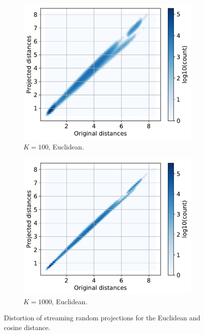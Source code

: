 \documentclass[11pt,onecolumn]{article}
\begin{document}
\begin{figure}[h!]
\begin{subfigure}[t]{0.29\textwidth}
				\includegraphics[width=\linewidth]{fig/streamhash_projection_euclidean_k100.pdf}
				\caption{$K=100$, Euclidean.}
		\end{subfigure}
		\hfill
		\begin{subfigure}[t]{0.29\textwidth}
				\centering
				\includegraphics[width=\linewidth]{fig/streamhash_projection_euclidean_k1000.pdf}
				\caption{$K=1000$, Euclidean.}
		\end{subfigure}
    \caption{Distortion of streaming random projections for the Euclidean and cosine distance.}
		\label{fig:distortion}
\end{figure}
\end{document}
